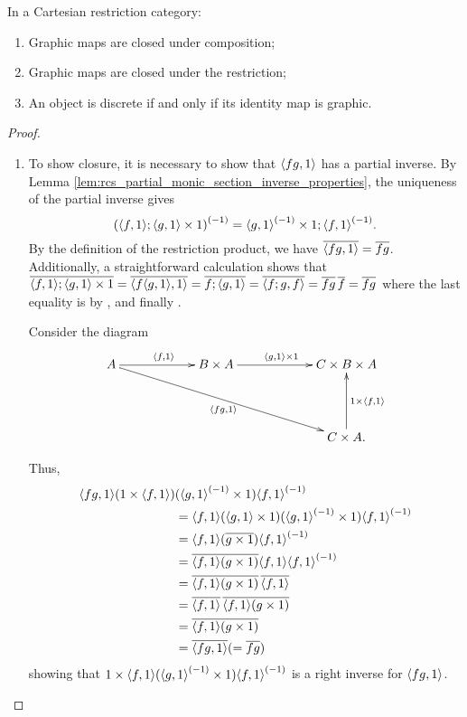 \begin{lemma}\label{lem:graphic_maps_are_closed_in_a_cartesian_restriction_category}
  In a Cartesian restriction category:
  \begin{enumerate}[{(}i{)}]
    \item Graphic maps are closed under composition;
    \item Graphic maps are closed under the restriction;
    \item An object is discrete if and only if its identity map is graphic.
  \end{enumerate}
\end{lemma}
\begin{proof}
  \prepprooflist
  \begin{enumerate}[{(}i{)}]
    \item To show closure, it is necessary to show that $\langle f g,1\rangle$ has a partial inverse.
      By Lemma \ref{lem:rcs_partial_monic_section_inverse_properties}, the uniqueness of the
      partial inverse gives
      \[
        {(\langle f,1\rangle ; \langle g,1\rangle\times 1)}^{(-1)} = {\langle g,1\rangle}^{(-1)} \times 1 ; {\langle f,1\rangle}^{(-1)} .
      \]
      By the definition of the restriction product, we have $\overline{\langle f g,1\rangle} = \overline{f g}$. Additionally,
      a straightforward calculation shows that
        $\overline{\langle f,1\rangle;\langle g,1\rangle \times 1} =
          \overline{\langle f\langle g,1\rangle, 1\rangle} = \overline{f ;\langle g,1\rangle}
          = \overline{\langle f;g, f\rangle} = \overline{f g}\,\overline{f} = \overline{f g}
        $
      where the last equality is by \rtwo, \rthree and finally \rone.

    Consider the diagram
    \[
      \xymatrix @C+35pt @R+20pt{
        A \ar[r]^{\<f,1\>} \ar[drr]_{\<f g,1\>} &
           B \times A  \ar[r]^{\<g,1\> \times 1}
           &  C \times B \times A \\
        &&C \times A. \ar[u]_{1 \times \<f,1\>}
      }
    \]

    Thus,
    \begin{align*}
      \langle f g,1\rangle  (1\times \langle f,1\rangle) &( {\langle g,1\rangle}^{(-1)}\times 1) {\langle f,1\rangle}^{(-1)}\\
      &=\langle f,1\rangle(\langle g,1\rangle\times 1 ) ({\langle g,1\rangle}^{(-1)}\times 1) {\langle f,1\rangle}^{(-1)}\\
      &=\langle f,1\rangle (\overline{g\times 1}) {\langle f,1\rangle}^{(-1)}\\
      &=\overline{\langle f,1\rangle (g\times 1)}  \langle f,1\rangle {\langle f,1\rangle}^{(-1)}\\
      &=\overline{\langle f,1\rangle (g\times 1)}\,  \overline{\langle f,1\rangle}\\
      &= \overline{\langle f,1\rangle}\, \overline{\langle f,1\rangle(g\times 1)}\\
      &= \overline{\langle f,1\rangle (g\times 1)}\\
      &= \overline{\langle f g,1\rangle}(=\overline{f g})\\
    \end{align*}
    showing that $1\times \langle f,1\rangle  ({\langle g,1\rangle}^{(-1)}\times 1 ) {\langle f,1\rangle}^{(-1)}$ is
    a right inverse for $\langle f g,1\rangle$.


\end{enumerate}
\end{proof}
